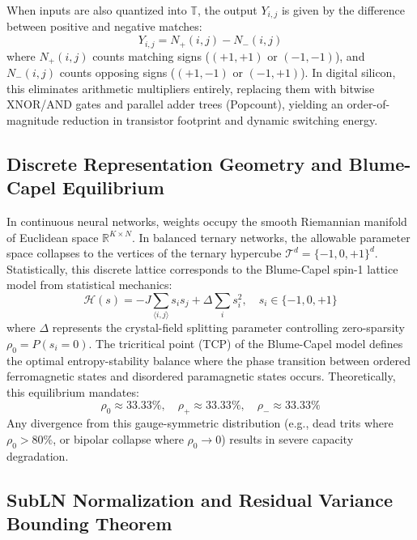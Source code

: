 \documentclass[11pt,a4paper]{article}
\begin{document}
When inputs are also quantized into $\mathbb{T}$, the output $Y_{i, j}$ is given by the difference between positive and negative matches:
\begin{equation}
Y_{i, j} = N_{+}(i, j) - N_{-}(i, j)
\end{equation}
where $N_{+}(i, j)$ counts matching signs ($(+1, +1)$ or $(-1, -1)$), and $N_{-}(i, j)$ counts opposing signs ($(+1, -1)$ or $(-1, +1)$). In digital silicon, this eliminates arithmetic multipliers entirely, replacing them with bitwise XNOR/AND gates and parallel adder trees (Popcount), yielding an order-of-magnitude reduction in transistor footprint and dynamic switching energy.

\subsection{Discrete Representation Geometry and Blume-Capel Equilibrium}

In continuous neural networks, weights occupy the smooth Riemannian manifold of Euclidean space $\mathbb{R}^{K \times N}$. In balanced ternary networks, the allowable parameter space collapses to the vertices of the ternary hypercube $\mathcal{T}^d = \{-1, 0, +1\}^d$. Statistically, this discrete lattice corresponds to the Blume-Capel spin-1 lattice model from statistical mechanics:
\begin{equation}
\mathcal{H}(s) = -J \sum_{\langle i, j \rangle} s_i s_j + \Delta \sum_i s_i^2, \quad s_i \in \{-1, 0, +1\}
\end{equation}
where $\Delta$ represents the crystal-field splitting parameter controlling zero-sparsity $\rho_0 = P(s_i = 0)$. The tricritical point (TCP) of the Blume-Capel model defines the optimal entropy-stability balance where the phase transition between ordered ferromagnetic states and disordered paramagnetic states occurs. Theoretically, this equilibrium mandates:
\begin{equation}
\rho_0 \approx 33.33\%, \quad \rho_{+} \approx 33.33\%, \quad \rho_{-} \approx 33.33\%
\end{equation}
Any divergence from this gauge-symmetric distribution (e.g., dead trits where $\rho_0 > 80\%$, or bipolar collapse where $\rho_0 \to 0$) results in severe capacity degradation.

\subsection{SubLN Normalization and Residual Variance Bounding Theorem}
\end{document}
